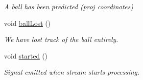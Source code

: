 \begin{DoxyCompactItemize}
\begin{DoxyCompactList}\small\item\em A ball has been predicted (proj coordinates) \end{DoxyCompactList}\item 
void \hyperlink{classTrackingStream_aa9420d28c57b65c325f796bb89d5e511}{ball\+Lost} ()\hypertarget{classTrackingStream_aa9420d28c57b65c325f796bb89d5e511}{}\label{classTrackingStream_aa9420d28c57b65c325f796bb89d5e511}

\begin{DoxyCompactList}\small\item\em We have lost track of the ball entirely. \end{DoxyCompactList}\item 
void \hyperlink{classTrackingStream_ac03f4afb930c3fd81d6d67f94e9a59a0}{started} ()\hypertarget{classTrackingStream_ac03f4afb930c3fd81d6d67f94e9a59a0}{}\label{classTrackingStream_ac03f4afb930c3fd81d6d67f94e9a59a0}

\begin{DoxyCompactList}\small\item\em Signal emitted when stream starts processing. \end{DoxyCompactList}\end{DoxyCompactItemize}
